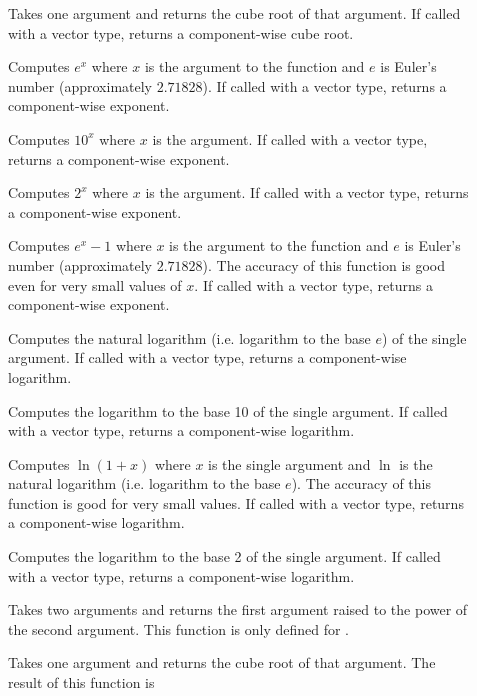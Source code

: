 \begin{description}
\item[]  Takes one argument and returns the
  cube root of that argument. If called with a vector type, returns a
  component-wise cube root.
\item[]  Computes $e^x$ where $x$ is the
  argument to the function and $e$ is Euler's number (approximately
  $2.71828$). If called with a vector type, returns a component-wise
  exponent.
\item[] Computes $10^x$ where $x$ is the argument. If called
  with a vector type, returns a component-wise exponent.
\item[] Computes $2^x$ where $x$ is the argument. If called
  with a vector type, returns a component-wise exponent.
\item[] Computes $e^x-1$ where $x$ is the argument to the
  function and $e$ is Euler's number (approximately $2.71828$). The
  accuracy of this function is good even for very small values of $x$. If
  called with a vector type, returns a component-wise exponent.
\item[]   Computes
  the natural logarithm (i.e. logarithm to the base $e$) of the single
  argument. If called with a vector type, returns a component-wise
  logarithm.
\item[]  Computes the logarithm to the base
  10 of the single argument. If called with a vector type, returns a
  component-wise logarithm.
\item[]   Computes
  $\ln(1+x)$ where $x$ is the single argument and $\ln$ is the natural
  logarithm (i.e. logarithm to the base $e$). The accuracy of this function
  is good for very small values. If called with a vector type, returns a
  component-wise logarithm.
\item[]  Computes the logarithm to the base
  2 of the single argument. If called with a vector type, returns a
  component-wise logarithm.
\item[]  Takes two arguments and returns the
  first argument raised to the power of the second argument. This function
  is only defined for .
\item[]  Takes one argument and
  returns the cube root of that argument. The result of this function is

\end{description}
